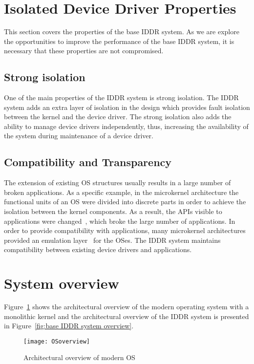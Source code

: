 \section{Isolated Device Driver Properties}
\label{sec:properties}
This section covers the properties of the base IDDR system. As we are explore the opportunities to improve the performance of the base IDDR system, it is necessary that these properties are not compromised.

\subsection*{Strong isolation}
One of the main properties of the IDDR system is strong isolation. The IDDR system adds an extra layer of isolation in the design which provides fault isolation between the kernel and the device driver. The strong isolation also adds the ability to manage device drivers independently, thus, increasing the availability of the system during maintenance of a device driver.

\subsection*{Compatibility and Transparency} 
The extension of existing OS structures usually results in a large number of broken applications. As a specific example, in the microkernel architecture the functional units of an OS were divided into discrete parts in order to achieve the isolation between the kernel components. As a result, the APIs visible to applications were changed~\cite{Heiser06arevirtualmachine}, which broke the large number of applications. In order to provide compatibility with applications, many microkernel architectures provided an emulation layer~\cite{Heiser06arevirtualmachine} for the OSes. The IDDR system maintains compatibility between existing device drivers and applications.

\section{System overview}\label{overview}

Figure~\ref{fig:monolithic} shows the architectural overview of the modern operating system with a monolithic kernel and the architectural overview of the IDDR system is presented in Figure~\ref{fig:base IDDR system overview}.
\begin{figure}[!ht]
\centering
\texttt{[image: OSoverview]}
\caption{Architectural overview of modern OS}
\label{fig:monolithic}
\end{figure}

